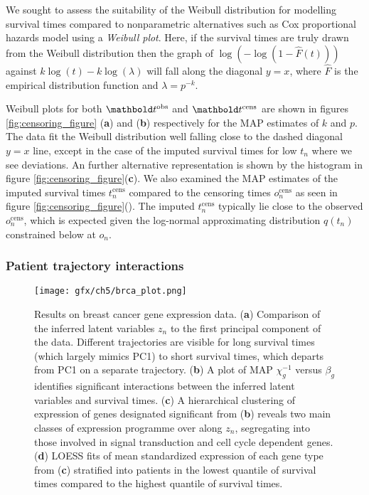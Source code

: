 We sought to assess the suitability of the Weibull distribution for modelling survival times compared to nonparametric alternatives such as Cox proportional hazards model using a \emph{Weibull plot}. Here, if the survival times are truly drawn from the Weibull distribution then the graph of $\log(-\log(1 - \hat{F}(t)))$ against $k \log(t) - k \log(\lambda)$ will fall along the diagonal $y=x$, where $\hat{F}$ is the empirical distribution function and $\lambda = p^{-k}$.

Weibull plots for both $\mbt^{\text{obs}}$ and $\mbt^{\text{cens}}$ are shown in figures \ref{fig:censoring_figure} (\textbf{a}) and (\textbf{b}) respectively for the MAP estimates of $k$ and $p$. The data fit the Weibull distribution well falling close to the dashed diagonal $y=x$ line, except in the case of the imputed survival times for low $t_n$ where we see deviations.
An further alternative representation is shown by the histogram in figure \ref{fig:censoring_figure}(\textbf{c}).%
We also examined the MAP estimates of the imputed survival times $t_n^{\text{cens}}$ compared to the censoring times $o_n^{\text{cens}}$ as seen in figure \ref{fig:censoring_figure}(). The imputed $t_n^{\text{cens}}$ typically lie close to the observed $o_n^{\text{cens}}$,
which is expected given the log-normal approximating distribution $q(t_n)$ constrained below at $o_n$.

\subsubsection{Patient trajectory interactions}

\begin{figure}
  \centering
\texttt{[image: gfx/ch5/brca\_plot.png]}
\caption{Results on breast cancer gene expression data.
(\textbf{a}) Comparison of the inferred latent variables $z_n$ to the first principal component of the data. Different trajectories are visible for long survival times (which largely mimics PC1) to short survival times, which departs from PC1 on a separate trajectory.
(\textbf{b}) A plot of MAP $\chi_g^{-1}$ versus $\beta_g$ identifies significant interactions between the inferred latent variables and survival times.
(\textbf{c}) A hierarchical clustering of expression of genes designated significant from (\textbf{b}) reveals two main classes of expression programme over along $z_n$, segregating into those involved in signal transduction and cell cycle dependent genes.
(\textbf{d}) LOESS fits of mean standardized expression of each gene type from (\textbf{c}) stratified into patients in the lowest quantile of survival times compared to the highest quantile of survival times.
} \label{fig:brca}
\end{figure}

